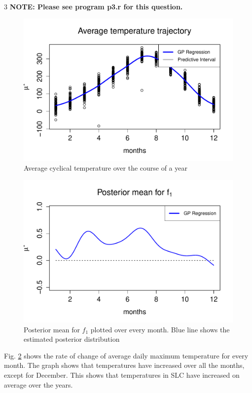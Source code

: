 \documentclass[11pt]{article}
\begin{document}
\par 3 \textbf{\large{NOTE: Please see program p3.r for this question.}}

\vspace{-10pt}

\begin{figure}[hbt!]
\centering
\includegraphics[width=0.8\linewidth]{p3a.pdf}
\vspace{-25pt}
\caption{Average cyclical temperature over the course of a year}
\label{fig3}
\end{figure}

\vspace{-20pt}

\begin{figure}[hbt!]
\centering
\includegraphics[width=0.8\linewidth]{p3b.pdf}
\vspace{-25pt}
\caption{Posterior mean for $f_1$ plotted over every month. Blue line shows the estimated posterior distribution }
\label{fig4}
\end{figure}

\par Fig. \ref{fig4} shows the rate of change of average daily maximum temperature for every month. The graph shows that temperatures have increased over all the months, except for December. This shows that temperatures in SLC have increased on average over the years.
\end{document}
